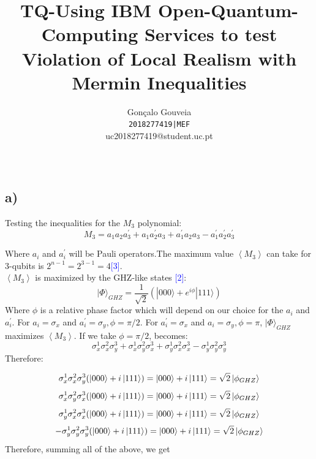 \documentclass{article}
\title{TQ-Using IBM Open-Quantum-Computing Services to test Violation of
Local Realism with Mermin Inequalities}
\author{
Gonçalo Gouveia\\
  \texttt{2018277419|MEF}\\
  uc2018277419@student.uc.pt\\
  \\
}
\begin{document}
\maketitle

\thispagestyle{empty}
\clearpage
\pagebreak
\section{}
\subsection*{a)}


Testing the inequalities for the $M_{3}$ polynomial:
\begin{equation}
  M_{3}=a_{1} a_{2} a_{3}^{\prime}+a_{1} a_{2}^{\prime} a_{3}+a_{1}^{\prime} a_{2} a_{3}-a_{1}^{\prime} a_{2}^{\prime} a_{3}^{\prime}  
\end{equation}

Where $a_{i}$ and $a_{i}^{\prime}$ will be Pauli operators.The maximum value $\left\langle M_{3}\right\rangle$ can take for 3-qubits is $2^{n-1}=2^{3-1}=4$\textcolor{blue}{[3]}.\\


$\left\langle M_{3}\right\rangle$ is maximized by the GHZ-like states \textcolor{blue}{[2]}:
$$
|\Phi\rangle_{G H Z}=\frac{1}{\sqrt{2}}\left(|000\rangle+e^{i \phi}|111\rangle\right)
$$
Where $\phi$ is a relative phase factor which will depend on our choice for the $a_{i}$ and $a_{i}^{\prime}$. For $a_{i}=\sigma_{x}$ and $a_{i}^{\prime}=\sigma_{y}, \phi=\pi / 2$. For $a_{i}^{\prime}=\sigma_{x}$ and $a_{i}=\sigma_{y}, \phi=\pi$, $|\Phi\rangle_{G H Z}$ maximizes $\left\langle M_{3}\right\rangle$. If we take $\phi=\pi / 2$,  becomes:
\begin{equation}
\sigma_{x}^{1} \sigma_{x}^{2} \sigma_{y}^{3}+\sigma_{x}^{1} \sigma_{y}^{2} \sigma_{x}^{3}+\sigma_{y}^{1} \sigma_{x}^{2} \sigma_{x}^{3}-\sigma_{y}^{1} \sigma_{y}^{2} \sigma_{y}^{3}
\end{equation}
Therefore:

\begin{equation*}
    \sigma^1_x\sigma^2_x\sigma^3_y(\ket{000}+i\ket{111})=\ket{000}+i\ket{111}=\sqrt{2}\ket{\phi_{GHZ}}
\end{equation*}
\begin{equation*}
     \sigma^1_x\sigma^2_y\sigma^3_x(\ket{000}+i\ket{111})=\ket{000}+i\ket{111} =\sqrt{2}\ket{\phi_{GHZ}}  
\end{equation*}
\begin{equation*}
     \sigma^1_y\sigma^2_x\sigma^3_x(\ket{000}+i\ket{111})=\ket{000}+i\ket{111}=\sqrt{2}\ket{\phi_{GHZ}}   
\end{equation*}
\begin{equation*}
     -\sigma^1_y\sigma^2_y\sigma^3_y(\ket{000}+i\ket{111})=\ket{000}+i\ket{111}=\sqrt{2}\ket{\phi_{GHZ}}   
\end{equation*}
Therefore, summing all of the above, we get
\end{document}

